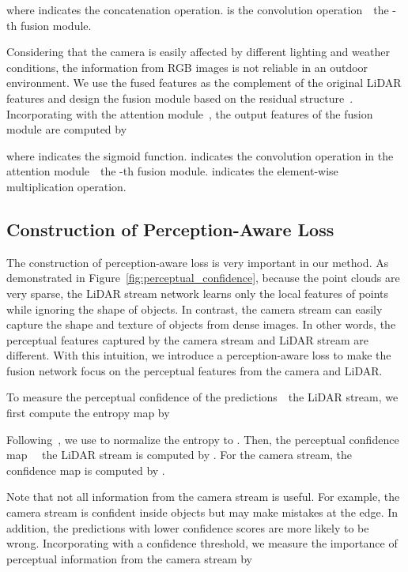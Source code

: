 \documentclass[10pt,twocolumn,letterpaper]{article}
\newcommand{\ice}[1]{{\color{black}#1}}
\begin{document}
where  indicates the concatenation operation.  is the convolution operation~\wrt~the -th fusion module. 

\ice{Considering that the camera is easily affected by different lighting and weather conditions, the information from RGB images is not reliable in an outdoor environment. We use the fused features as the complement of the original LiDAR features and design the fusion module based on the residual structure~\cite{he2016deep}.} Incorporating with the attention module~\cite{bochkovskiy2020yolov4}, the output features  of the fusion module are computed by

where  indicates the sigmoid function.  indicates the convolution operation in the attention module~\wrt~the -th fusion module.  indicates the element-wise multiplication operation.










\subsection{Construction of Perception-Aware Loss}
\label{sec:loss}

The construction of perception-aware loss is very important in our method. As demonstrated in Figure~\ref{fig:perceptual_confidence}, because the point clouds are very sparse, the LiDAR stream network learns only the local features of points while ignoring the shape of objects. In contrast, the camera stream can easily capture the shape and texture of objects from dense images. In other words, the perceptual features captured by the camera stream and LiDAR stream are different. With this intuition, we introduce a perception-aware loss to make the fusion network focus on the perceptual features from the camera and LiDAR.


To measure the perceptual confidence of the predictions~\wrt~the LiDAR stream, we first compute the entropy map  by 

Following~\cite{renyi1961measures}, we use  to normalize the entropy to . Then, the perceptual confidence map ~\wrt~the LiDAR stream is computed by . For the camera stream, the confidence map is computed by .

Note that not all information from the camera stream is useful. For example, the camera stream is confident inside objects but may make mistakes at the edge. In addition, the predictions with lower confidence scores are more likely to be wrong. Incorporating with a confidence threshold, we measure the importance of perceptual information from the camera stream by
\end{document}
